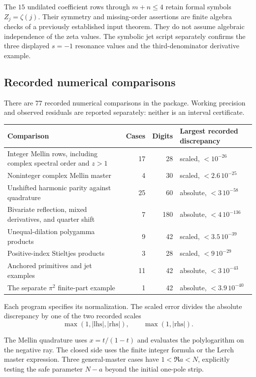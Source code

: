 The $15$ undilated coefficient rows through $m+n\le4$ retain formal
symbols $Z_j=\zeta(j)$. Their symmetry and missing-order assertions are
finite algebra checks of a previously established input theorem. They
do not assume algebraic independence of the zeta values. The symbolic
jet script separately confirms the three displayed $s=-1$ resonance
values and the third-denominator derivative example.

\subsection{Recorded numerical comparisons}

There are $77$ recorded numerical comparisons in the package. Working
precision and observed residuals are reported separately: neither is
an interval certificate.
\begin{center}
\small
\begin{tabularx}{\textwidth}{@{}Yrr>{\raggedright\arraybackslash}p{0.23\textwidth}@{}}
\toprule
Comparison & Cases & Digits & Largest recorded discrepancy\\
\midrule
Integer Mellin rows, including complex spectral order and $z>1$
 &17&28&scaled, $<10^{-26}$\\
Noninteger complex Mellin master
 &4&30&scaled, $<2.6\,10^{-25}$\\
Unshifted harmonic parity against quadrature
 &25&60&absolute, $<3\,10^{-58}$\\
Bivariate reflection, mixed derivatives, and quarter shift
 &7&180&absolute, $<4\,10^{-136}$\\
Unequal-dilation polygamma products
 &9&42&scaled, $<3.5\,10^{-39}$\\
Positive-index Stieltjes products
 &3&28&scaled, $<9\,10^{-29}$\\
Anchored primitives and jet examples
 &11&42&absolute, $<3\,10^{-43}$\\
The separate $\pi^2$ finite-part example
 &1&42&absolute, $<3.9\,10^{-40}$\\
\bottomrule
\end{tabularx}
\end{center}
Each program specifies its normalization. The scaled error divides the
absolute discrepancy by one of the two recorded scales
\[
 \max(1,|\mathrm{lhs}|,|\mathrm{rhs}|),\qquad
 \max(1,|\mathrm{rhs}|).
\]

The Mellin quadrature uses $x=t/(1-t)$ and evaluates the polylogarithm
on the negative ray. The closed side uses the finite integer formula
or the Lerch master expression. Three general-master cases have
$1<\Re a<N$, explicitly testing the safe parameter $N-a$ beyond the
initial one-pole strip.

